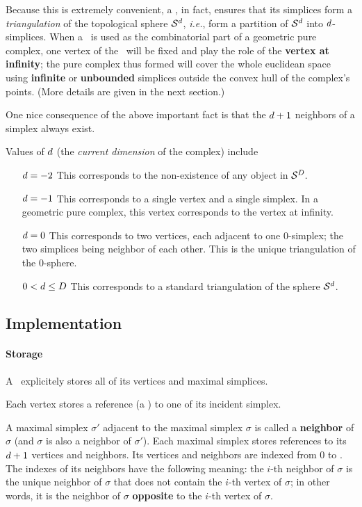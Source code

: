 {{Because this is extremely convenient, a \tds, in fact, ensures that its
simplices form a \emph{triangulation} of the topological sphere $\mathcal S^{d}$,
\emph{i.e.}, form a partition of $\mathcal S^{d}$ into $d$-simplices. When a
\tds\ is used as the combinatorial part of a geometric pure complex, one
vertex of the \tds\ will be fixed and play the role of the \textbf{vertex at
infinity}; the pure complex thus formed will cover the whole euclidean space
using \textbf{infinite} or \textbf{unbounded} simplices outside the convex
hull of the complex's points. (More details are given in the next section.)

One nice consequence of the above important fact is that the $d+1$ neighbors
of a simplex always exist.

Values of $d$ (the \emph{current dimension} of the complex) include
\begin{itemize}
\item[$d=-2$] This corresponds to the non-existence of any object in
$\mathcal S^{D}.$
\item[$d=-1$] This corresponds to a single vertex and a single simplex. In a
geometric pure complex, this vertex corresponds to the vertex at infinity.
\item[$d=0$] This corresponds to two vertices, each adjacent to one $0$-simplex;
the two simplices being neighbor of each other. This is the unique
triangulation of the $0$-sphere.
\item[$0<d\le D$] This corresponds to a standard triangulation of
the sphere $\mathcal S^{d}$.
\end{itemize}


\subsection{Implementation\label{triangulation:tds:impl}}

\paragraph{Storage}

A \tds\ explicitely stores all of its vertices and maximal simplices.

Each vertex stores a reference (a ) to one of its incident
simplex.

A maximal simplex $\sigma'$ adjacent to the maximal simplex $\sigma$ is called
a \textbf{neighbor} of $\sigma$ (and $\sigma$ is also a neighbor of
$\sigma'$). Each maximal simplex stores references to its $d+1$ vertices and
neighbors. Its vertices and neighbors are indexed from $0$ to \cd. The indexes
of its neighbors have the following meaning: the $i$-th neighbor of $\sigma$
is the unique neighbor of $\sigma$ that does not contain the $i$-th vertex of
$\sigma$; in other words, it is the neighbor of $\sigma$ \textbf{opposite} to
the $i$-th vertex of $\sigma$.

}}
